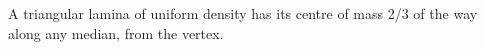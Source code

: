  A triangular lamina of uniform density has its centre of mass 
2/3 of the way along any median, from the vertex.
